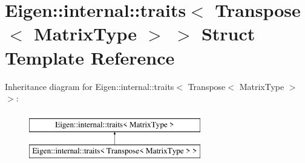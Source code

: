 \hypertarget{struct_eigen_1_1internal_1_1traits_3_01_transpose_3_01_matrix_type_01_4_01_4}{}\section{Eigen\+::internal\+::traits$<$ Transpose$<$ Matrix\+Type $>$ $>$ Struct Template Reference}
\label{struct_eigen_1_1internal_1_1traits_3_01_transpose_3_01_matrix_type_01_4_01_4}
Inheritance diagram for Eigen\+::internal\+::traits$<$ Transpose$<$ Matrix\+Type $>$ $>$\+:\begin{figure}[H]
\begin{center}
\leavevmode
\includegraphics[height=2.000000cm]{struct_eigen_1_1internal_1_1traits_3_01_transpose_3_01_matrix_type_01_4_01_4}
\end{center}
\end{figure}
